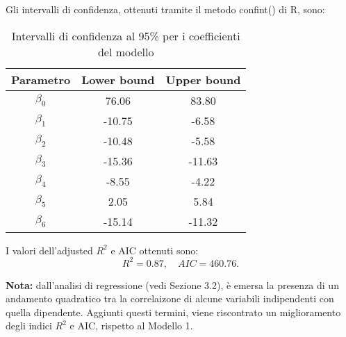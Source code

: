 Gli intervalli di confidenza, ottenuti tramite il metodo confint() di R, sono:
\begin{table}[H]
	\centering
	\begin{tabular}{|c|c|c|}
		\hline
		\textbf{Parametro} & \textbf{Lower bound} & \textbf{Upper bound} \\
		\hline
		$\beta_0$ & 76.06 & 83.80 \\
		$\beta_1$ & -10.75 & -6.58 \\
		$\beta_2$ & -10.48 & -5.58 \\
		$\beta_3$ & -15.36 & -11.63 \\
		$\beta_4$ & -8.55 & -4.22 \\
		$\beta_5$ & 2.05 & 5.84 \\
		$\beta_6$ & -15.14 & -11.32 \\
		\hline
	\end{tabular}
	\caption{Intervalli di confidenza al 95\% per i coefficienti del modello}
	\label{tab:ci_coefficienti}
\end{table}

I valori dell'adjusted $R^2$  e AIC ottenuti sono:
\begin{equation*}
	R^2 =   0.87, \quad AIC = 460.76.
\end{equation*}

\textbf{Nota:} dall'analisi di regressione (vedi Sezione 3.2), è emersa la presenza di un andamento quadratico tra la correlaizone di alcune variabili indipendenti con quella dipendente. Aggiunti questi termini, viene riscontrato un miglioramento degli indici $R^2$ e AIC, rispetto al Modello 1.

